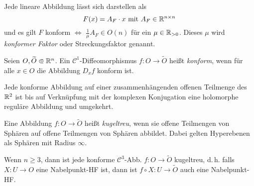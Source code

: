 \documentclass{cheat-sheet}
\begin{document}
\begin{bem}
  Jede lineare Abbildung lässt sich darstellen als
  \[ F(x) = A_F \cdot x \text{ mit } A_F \in \mathbb{R}^{n \times n} \]
  und es gilt $F$ konform $\iff$ $\tfrac{1}{\mu} A_F \in O(n)$ für ein $\mu \in \mathbb{R}_{> 0}$. Dieses $\mu$ wird \emph{konformer Faktor} oder Streckungsfaktor genannt.
\end{bem}

\begin{definition}
  Seien $O, \widetilde{O} \opn \R^n$. Ein $\mathcal{C}^1$-Diffeomorphismus $f : O \to \widetilde{O}$ heißt \emph{konform}, wenn für alle $x \in O$ die Abbildung $D_x f$ konform ist.
\end{definition}

\iffalse
\begin{bem}[Konforme Abbildungen im $\R^2$]
  Sei $O \opn \C \cong \R^2$ zusammenhängend und $f : O \to \widetilde{O}$ konform.
  Sei $\lambda : O \to \R_{> 0}$ der konforme Faktor, d.\,h. $\lambda(x)^{-1} D_x f \in O(n)$.
  Ohne Einschränkung ist $\det(D_x f) > 0$ für alle $x \in O$ (sonst $\widetilde{f} = f \circ \overline{\,\cdot\,}$).
  Es folgt: $D_x f = \lambda(x) \begin{psmallmatrix} \cos \alpha_x & \sin \alpha_x \\ -\sin \alpha_x & \cos \alpha_x \end{psmallmatrix} = \lambda(x) \cdot e^{i \alpha_x} \in \C$, also ist $f$ holomorph.
\end{bem}
\fi

\begin{satz}
  Jede konforme Abbildung auf einer zusammenhängenden offenen Teilmenge des $\R^2$ ist bis auf Verknüpfung mit der komplexen Konjugation eine holomorphe reguläre Abbildung und umgekehrt.
\end{satz}

\begin{definition}
  Eine Abbildung $f : O \to \widetilde{O}$ heißt \emph{kugeltreu}, wenn sie offene Teilmengen von Sphären auf offene Teilmengen von Sphären abbildet. Dabei gelten Hyperebenen als Sphären mit Radius $\infty$.
\end{definition}

\begin{satz}[Liouville]
  Wenn $n \geq 3$, dann ist jede konforme $\mathcal{C}^3$-Abb. $f : O \to \widetilde{O}$ kugeltreu, d.\,h. falls $X : U \to O$ eine Nabelpunkt-HF ist, dann ist $f \circ X : U \to \widetilde{O}$ auch eine Nabelpunkt-HF.
\end{satz}
\end{document}
